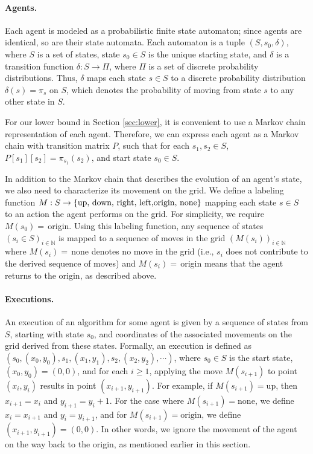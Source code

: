 \documentclass[11pt]{article}
\newcommand{\N}{\mathbb{N}}
\begin{document}
\paragraph{Agents.}
Each agent is modeled as a probabilistic finite state automaton; since agents are identical, so are their state automata. Each automaton is a tuple $(S, s_0, \delta)$, where $S$ is a set of states, state $s_0 \in S$ is the unique starting state, and $\delta$ is a transition function  $\delta: S \to \Pi$, where $\Pi$ is a set of discrete probability distributions. Thus, $\delta$ maps each state $s \in S$ to a discrete probability distribution $\delta(s) = \pi_s$ on $S$, which denotes the probability of moving from state $s$ to any other state in $S$. 

For our lower bound in Section \ref{sec:lower}, it is convenient to use a Markov chain representation of each agent. Therefore, we can express each agent as a Markov chain with transition matrix $P$, such that for each $s_1, s_2 \in S$, $P[s_1][s_2] = \pi_{s_1}(s_2)$, and start state $s_0 \in S$. 

In addition to the Markov chain that describes the evolution of an agent's state, we also need to characterize its movement on the grid. We define a  labeling function $M : S \to \{\text{up, down, right, left,} \\ \text{origin, none}\}$ mapping each state $s\in S$ to an action the agent performs on the grid. For simplicity, we require $M(s_0) =\,$origin. Using this labeling function, any sequence of states $(s_i\in S)_{i\in \N}$ is mapped to a sequence of moves in the grid $(M(s_i))_{i\in \N}$ where $M(s_i)=\,$none denotes no move in the grid (i.e., $s_i$ does not contribute to the derived sequence of moves) and $M(s_i)=\,$origin means that the agent returns to the origin, as described above. 

\paragraph{Executions.}
An execution of an algorithm for some agent is given by a sequence of states from $S$, starting with state $s_0$, and coordinates of the associated movements on the grid derived from these states. Formally, an execution is defined as $(s_0, (x_0, y_0), s_1, (x_1, y_1), s_2, (x_2, y_2), \cdots)$, where $s_0 \in S$ is the start state, $(x_0, y_0) = (0,0)$, and for each $i \geq 1$, applying the move $M(s_{i+1})$ to point $(x_i, y_i)$ results in point $(x_{i+1}, y_{i+1})$. For example, if $M(s_{i+1}) = \text{up}$, then $x_{i+1}=x_i$ and $y_{i+1} = y_i + 1$. For the case where $M(s_{i+1}) = \text{none}$, we define $x_i = x_{i+1}$ and $y_i = y_{i+1}$, and for $M(s_{i+1}) = \text{origin}$, we define $(x_{i+1}, y_{i+1}) = (0,0)$. In other words, we ignore the movement of the agent on the way back to the origin, as mentioned earlier in this section. 
\end{document}
